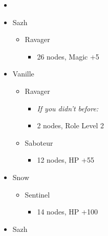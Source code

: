 \begin{multicols}{2}
\begin{menu}
\begin{itemize}
    \paradigm
    \begin{itemize}
        \item {}%
{\paradigmline[1]{\textit{\syn}}{\textit{\sab}}{\textit{\rav}}}%
{\paradigmline{\com}{\med}{\com}}%
{\paradigmline{\syn}{\med}{\com}}%
{\paradigmline{\com}{\sab}{\com}}%
{\paradigmline{(\rav)}{\sab}{(\rav)}}%
{\paradigmline{\com}{\rav}{\com}}
    \end{itemize}
    \crystarium
    \begin{itemize}
        \item Sazh
        \begin{itemize}
            \item Ravager
            \begin{itemize}
                \item 26 nodes, Magic +5
            \end{itemize}
        \end{itemize}
        \item Vanille
        \begin{itemize}
            \item Ravager
            \begin{itemize}
                \item \textit{If you didn't before:}
                \item 2 nodes, Role Level 2
            \end{itemize}
            \item Saboteur
            \begin{itemize}
                \item 12 nodes, HP +55
            \end{itemize}
        \end{itemize}
        \item Snow
        \begin{itemize}
            \item Sentinel
            \begin{itemize}
                \item 14 nodes, HP +100
            \end{itemize}
        \end{itemize}
    \end{itemize}
    \equip
    \begin{itemize}
        \item Sazh

\end{itemize}
\end{itemize}
\end{menu}
\end{multicols}
